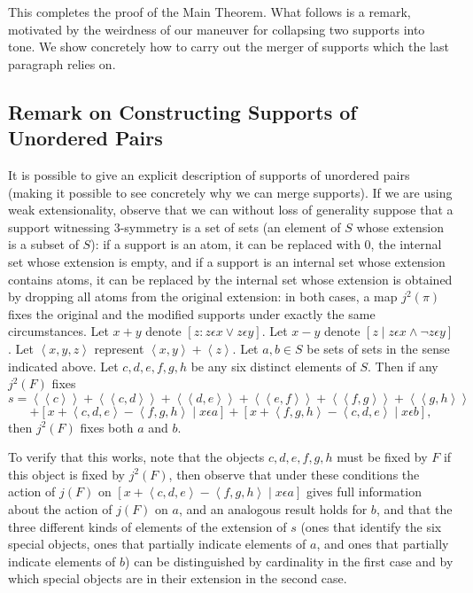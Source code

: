 \documentclass[12pt]{article}
\begin{document}
\begin{description}
This completes the proof of the Main Theorem.  What follows is a remark, motivated by the weirdness of our maneuver for collapsing two supports into tone.  We show concretely how
to carry out the merger of supports which the last paragraph relies on.

\subsection{Remark on Constructing Supports of Unordered Pairs}

It is possible to give an explicit description of supports of unordered pairs (making it possible to see concretely why we can merge supports).  If we are using weak extensionality, observe that we can without loss of generality suppose that a support witnessing 3-symmetry is a set of sets (an element of $S$ whose extension is a subset of $S$):  if a support is an atom, it can be replaced with 0, the internal set whose extension is empty, and if a support is an internal set whose extension contains atoms, it can be replaced by the internal set whose extension is obtained by dropping all atoms from the original extension:  in both cases, a map $j^2(\pi)$ fixes the original and the modified supports under exactly the same circumstances.   Let $x+y$ denote
$[z:z \epsilon x \vee z \epsilon y]$.   Let $x-y$ denote $[z\mid z \epsilon x \wedge \neg z \epsilon y]$.  Let $\left<x,y,z\right>$ represent $\left<x,y\right>+\left<z\right>$.
Let $a,b \in S$ be sets of sets in the sense indicated above.  Let $c,d,e,f,g,h$ be any six distinct elements of $S$.  Then if any $j^2(F)$ fixes $$s=\left<\left<c\right>\right>+\left<\left<c,d\right>\right>+\left<\left<d,e\right>\right>+\left<\left<e,f\right>\right>+\left<\left<f,g\right>\right>+\left<\left<g,h\right>\right>$$ $$
+[x+\left<c,d,e\right>-\left<f,g,h\right>\mid x \epsilon a]+[x+\left<f,g,h\right>-\left<c,d,e\right>\mid x \epsilon b],$$ then $j^2(F)$ fixes both $a$ and $b$.   

To verify that this works, note that the objects $c,d,e,f,g,h$ must be fixed by $F$ if this object is fixed by $j^2(F)$, then observe that under these conditions the action of $j(F)$ on $[x+\left<c,d,e\right>-\left<f,g,h\right>\mid x \epsilon a]$ gives full information about the action of $j(F)$ on $a$, and an analogous result holds for $b$, and that the three different kinds of elements of the extension of $s$
(ones that identify the six special objects, ones that partially indicate elements of $a$, and ones that partially indicate elements of $b$) can be distinguished by cardinality in the first case and by which special objects are in their extension in the second case.

\end{description}
\end{document}

